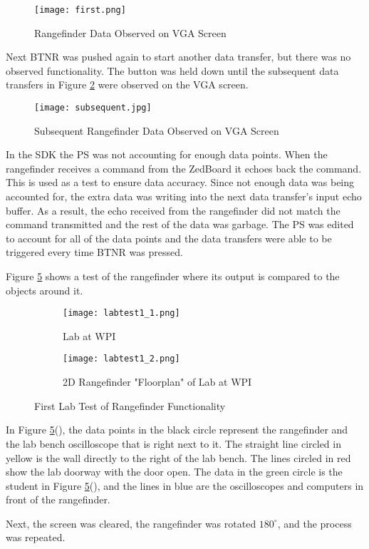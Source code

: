 \begin{figure}[H]
	\centerline{\texttt{[image: first.png]}}
	\caption{Rangefinder Data Observed on VGA Screen}
	\label{first}
\end{figure}

Next BTNR was pushed again to start another data transfer, but there was no observed functionality. The button was held down until the subsequent data transfers in Figure \ref{subsequent} were observed on the VGA screen.

\begin{figure}[H]
	\centerline{\texttt{[image: subsequent.jpg]}}
	\caption{Subsequent Rangefinder Data Observed on VGA Screen}
	\label{subsequent}
\end{figure}

In the SDK the PS was not accounting for enough data points. When the rangefinder receives a command from the ZedBoard it echoes back the command. This is used as a test to ensure data accuracy. Since not enough data was being accounted for, the extra data was writing into the next data transfer's input echo buffer. As a result, the echo received from the rangefinder did not match the command transmitted and the rest of the data was garbage. The PS was edited to account for all of the data points and the data transfers were able to be triggered every time BTNR was pressed.
\par
Figure \ref{labtest1} shows a test of the rangefinder where its output is compared to the objects around it.

\begin{figure}[H] 
	\begin{subfigure}{1\textwidth}
	\centering
		\texttt{[image: labtest1\_1.png]}
		\caption{Lab at WPI}
		\label{lab1}
	\end{subfigure}
	\begin{subfigure}{1\textwidth}
	\centering
		\texttt{[image: labtest1\_2.png]}
		\caption{2D Rangefinder "Floorplan" of Lab at WPI}
		\label{floorplan1}
	\end{subfigure}
	\caption{First Lab Test of Rangefinder Functionality}
	\label{labtest1}
\end{figure}

In Figure \ref{labtest1}(), the data points in the black circle represent the rangefinder and the lab bench oscilloscope that is right next to it. The straight line circled in yellow is the wall directly to the right of the lab bench. The lines circled in red show the lab doorway with the door open. The data in the green circle is the student in Figure \ref{labtest1}(), and the lines in blue are the oscilloscopes and computers in front of the rangefinder.
\par
Next, the screen was cleared, the rangefinder was rotated $180^\circ$, and the process was repeated.

